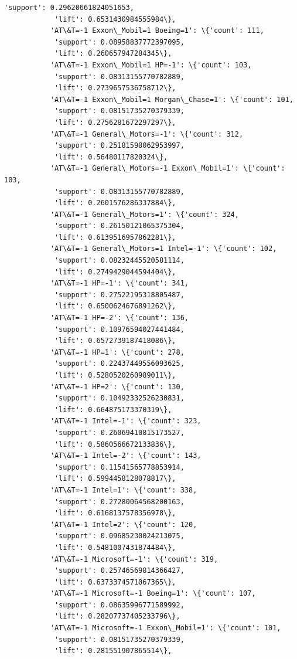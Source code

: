 \documentclass[11pt]{article}
\begin{document}
\begin{Verbatim}[commandchars=\\\{\}]
            'support': 0.29620661824051653,
            'lift': 0.6531430984555984\},
           'AT\&T=-1 Exxon\_Mobil=1 Boeing=1': \{'count': 111,
            'support': 0.08958837772397095,
            'lift': 0.260657947284345\},
           'AT\&T=-1 Exxon\_Mobil=1 HP=-1': \{'count': 103,
            'support': 0.08313155770782889,
            'lift': 0.2739657536758712\},
           'AT\&T=-1 Exxon\_Mobil=1 Morgan\_Chase=1': \{'count': 101,
            'support': 0.08151735270379339,
            'lift': 0.2756281672297297\},
           'AT\&T=-1 General\_Motors=-1': \{'count': 312,
            'support': 0.25181598062953997,
            'lift': 0.56480117820324\},
           'AT\&T=-1 General\_Motors=-1 Exxon\_Mobil=1': \{'count': 103,
            'support': 0.08313155770782889,
            'lift': 0.2601576286337884\},
           'AT\&T=-1 General\_Motors=1': \{'count': 324,
            'support': 0.26150121065375304,
            'lift': 0.6139516957862281\},
           'AT\&T=-1 General\_Motors=1 Intel=-1': \{'count': 102,
            'support': 0.08232445520581114,
            'lift': 0.2749429044594404\},
           'AT\&T=-1 HP=-1': \{'count': 341,
            'support': 0.27522195318805487,
            'lift': 0.6500624676891262\},
           'AT\&T=-1 HP=-2': \{'count': 136,
            'support': 0.10976594027441484,
            'lift': 0.6572739187418086\},
           'AT\&T=-1 HP=1': \{'count': 278,
            'support': 0.22437449556093625,
            'lift': 0.5280520260989011\},
           'AT\&T=-1 HP=2': \{'count': 130,
            'support': 0.10492332526230831,
            'lift': 0.664875173370319\},
           'AT\&T=-1 Intel=-1': \{'count': 323,
            'support': 0.26069410815173527,
            'lift': 0.5860566672133836\},
           'AT\&T=-1 Intel=-2': \{'count': 143,
            'support': 0.11541565778853914,
            'lift': 0.5994458128078817\},
           'AT\&T=-1 Intel=1': \{'count': 338,
            'support': 0.27280064568200163,
            'lift': 0.6168137578356978\},
           'AT\&T=-1 Intel=2': \{'count': 120,
            'support': 0.09685230024213075,
            'lift': 0.5481007431874484\},
           'AT\&T=-1 Microsoft=-1': \{'count': 319,
            'support': 0.25746569814366427,
            'lift': 0.6373374571067365\},
           'AT\&T=-1 Microsoft=-1 Boeing=1': \{'count': 107,
            'support': 0.08635996771589992,
            'lift': 0.28207737405233796\},
           'AT\&T=-1 Microsoft=-1 Exxon\_Mobil=1': \{'count': 101,
            'support': 0.08151735270379339,
            'lift': 0.281551907865514\},

\end{Verbatim}
\end{document}
